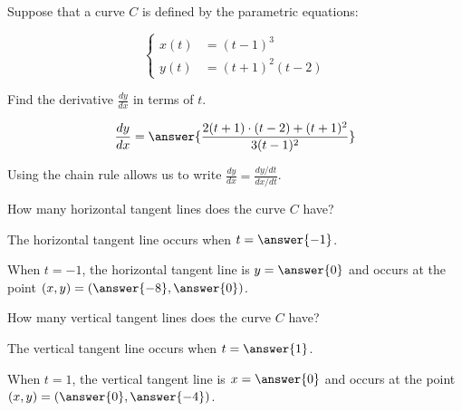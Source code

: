 \documentclass{ximera}
\author{Alex Beckwith}
\begin{document}
\begin{exercise}

Suppose that a curve $C$ is defined by the parametric equations:

\[
\begin{cases}
x(t) &= (t-1)^3 \\
y(t) &= (t+1)^2(t-2)
\end{cases}
\]

Find the derivative $\frac{dy}{dx}$ in terms of $t$.

\[
\frac{dy}{dx} = \answer{\frac{2(t+1)\cdot(t-2) +(t+1)^2}{3(t-1)^2}}
\]

\begin{hint}
Using the chain rule allows us to write $\frac{dy}{dx} = \frac{dy/dt}{dx/dt}$.
\end{hint}

\begin{exercise}
How many horizontal tangent lines does the curve $C$ have?
\begin{multipleChoice}
\end{multipleChoice}

The horizontal tangent line occurs when $t=\answer{-1}$.

\begin{exercise}
When $t=-1$, the horizontal tangent line is $y=\answer{0}$ and occurs at the point $(x,y) = \left(\answer{-8},\answer{0}\right)$.
\end{exercise}

\begin{exercise}
How many vertical tangent lines does the curve $C$ have?
\begin{multipleChoice}
\end{multipleChoice}

The vertical tangent line occurs when $t=\answer{1}$.

When $t=1$, the vertical tangent line is $x=\answer{0}$ and occurs at the point $(x,y) = \left(\answer{0},\answer{-4}\right)$.
\end{exercise}
\end{exercise}
\end{exercise}
\end{document}
